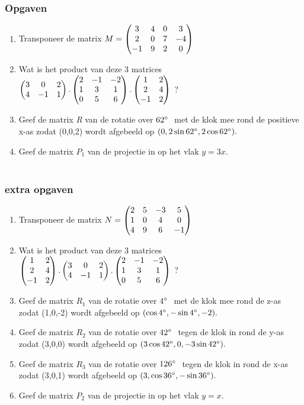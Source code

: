 \documentclass[hidelinks, a4wide, 12pt,  twoside]{book}
\begin{document}
\subsubsection{Opgaven}
\begin{enumerate}
	\item Transponeer de matrix 
	$ M = \begin{pmatrix}  3 & 4 & 0 &  3 \\  2 &  0 & 7 & -4 \\ -1 & 9 & 2 & 0  \end{pmatrix} $
	
	\item Wat is het product van deze  3 matrices
	$ \begin{pmatrix}  3 & 0 & 2  \\  4 &  -1 & 1 \end{pmatrix} .
	\begin{pmatrix}  2 & -1 & -2  \\  1 &  3 & 1  \\ 0 & 5 & 6  \end{pmatrix}  . 
	\begin{pmatrix}  1 & 2  \\  2 &  4  \\ -1 & 2  \end{pmatrix} $	?
	
	\item Geef de matrix  \textit{R } van de rotatie over $ 62\degree \ $ met de klok mee rond de positieve x-as zodat (0,0,2) wordt afgebeeld op $ (0, 2\sin 62\degree , 2\cos 62\degree ). $ 
	
	\item Geef de matrix  \textit{$ P_1 $} van de projectie  in \RD op het vlak $  y=3x $. \\ \\
	
\end{enumerate}

\subsubsection{extra opgaven}
\begin{enumerate}
	\item  Transponeer de matrix 
	$ N = \begin{pmatrix}  2 & 5 & -3 &  5 \\  1 &  0 & 4 & 0 \\ 4 & 9 & 6 & -1  \end{pmatrix}$
	
	\item Wat is het product van deze  3 matrices
	$ \begin{pmatrix}  1 & 2  \\  2 &  4 \\  -1 & 2  \end{pmatrix} .
	\begin{pmatrix}  3 & 0 & 2  \\  4 &  -1 & 1  \end{pmatrix}  . 
	\begin{pmatrix}   2 & -1 & -2  \\  1 &  3 & 1  \\ 0 & 5 & 6   \end{pmatrix} $	?
	
	\item Geef de matrix  \textit{$ R_1  $} van de rotatie over $ 4\degree \  $  met de klok mee rond de  z-as zodat (1,0,-2) wordt afgebeeld op $ (\cos 4\degree , -\sin 4\degree , -2) . $ 
	
	\item Geef de matrix  \textit{$ R_2 $} van de rotatie over $ 42\degree \  $ tegen de klok in rond de  y-as zodat (3,0,0) wordt afgebeeld op $ (3\cos 42\degree , 0,  -3\sin 42\degree ). $ 
	
	\item Geef de matrix  \textit{$ R_3 $} van de rotatie over $ 126\degree \  $ tegen de klok in rond de  x-as zodat (3,0,1) wordt afgebeeld op $ (3, \cos 36\degree ,  -\sin 36\degree ). $ 
	
	\item Geef de matrix  \textit{$ P_2 $} van de projectie  in \RD op het vlak $  y=x $.
\end{enumerate}
\end{document}
